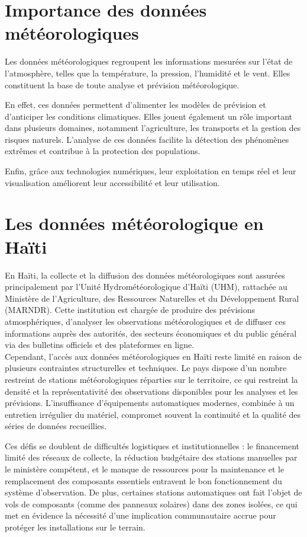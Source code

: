 \clearpage
\section{ Importance des données météorologiques}
Les données météorologiques regroupent les informations mesurées sur l’état de l’atmosphère, telles que la température, la pression, l’humidité et le vent. Elles constituent la base de toute analyse et prévision météorologique.

En effet, ces données permettent d’alimenter les modèles de prévision et d’anticiper les conditions climatiques. Elles jouent également un rôle important dans plusieurs domaines, notamment l’agriculture, les transports et la gestion des risques naturels. L’analyse de ces données facilite la détection des phénomènes extrêmes et contribue à la protection des populations.

Enfin, grâce aux technologies numériques, leur exploitation en temps réel et leur visualisation améliorent leur accessibilité et leur utilisation.

\section{Les données météorologique en Haïti}
En Haïti, la collecte et la diffusion des données météorologiques sont assurées principalement par l’Unité Hydrométéorologique d’Haïti (UHM), rattachée au Ministère de l’Agriculture, des Ressources Naturelles et du Développement Rural (MARNDR). Cette institution est chargée de produire des prévisions atmosphériques, d’analyser les observations météorologiques et de diffuser ces informations auprès des autorités, des secteurs économiques et du public général via des bulletins officiels et des plateformes en ligne.\\

\noindent Cependant, l’accès aux données météorologiques en Haïti reste limité en raison de plusieurs contraintes structurelles et techniques. Le pays dispose d’un nombre restreint de stations météorologiques réparties sur le territoire, ce qui restreint la densité et la représentativité des observations disponibles pour les analyses et les prévisions. L’insuffisance d’équipements automatiques modernes, combinée à un entretien irrégulier du matériel, compromet souvent la continuité et la qualité des séries de données recueillies. 


\noindent Ces défis se doublent de difficultés logistiques et institutionnelles : le financement limité des réseaux de collecte, la réduction budgétaire des stations manuelles par le ministère compétent, et le manque de ressources pour la maintenance et le remplacement des composants essentiels entravent le bon fonctionnement du système d’observation. De plus, certaines stations automatiques ont fait l’objet de vols de composants (comme des panneaux solaires) dans des zones isolées, ce qui met en évidence la nécessité d’une implication communautaire accrue pour protéger les installations sur le terrain. 

